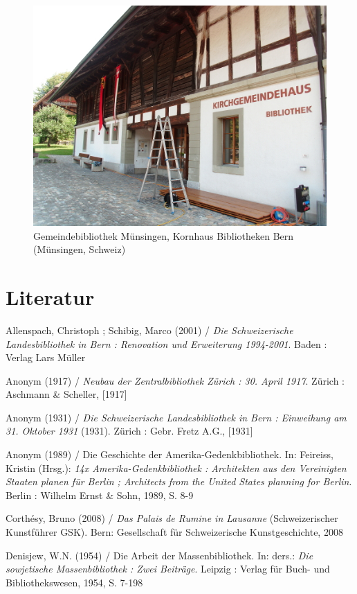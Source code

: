 \documentclass[a4paper,
fontsize=11pt,
oneside,
numbers=noperiodatend,
parskip=half-,
bibliography=totoc,
final
]{scrartcl}
\begin{document}
\begin{figure}[H]
\centering
\includegraphics{./img/066.jpg}
\caption{Gemeindebibliothek Münsingen, Kornhaus Bibliotheken Bern
(Münsingen,
Schweiz)}
\end{figure}

\newpage

\section*{Literatur}\label{literatur}

Allenspach, Christoph ; Schibig, Marco (2001) / \emph{Die Schweizerische
Landesbibliothek in Bern : Renovation und Erweiterung 1994-2001}. Baden
: Verlag Lars Müller

Anonym (1917) / \emph{Neubau der Zentralbibliothek Zürich : 30. April
1917}. Zürich : Aschmann \& Scheller, {[}1917{]}

Anonym (1931) / \emph{Die Schweizerische Landesbibliothek in Bern :
Einweihung am 31. Oktober 1931} (1931). Zürich : Gebr. Fretz A.G.,
{[}1931{]}

Anonym (1989) / Die Geschichte der Amerika-Gedenkbibliothek. In:
Feireiss, Kristin (Hrsg.): \emph{14x Amerika-Gedenkbibliothek :
Architekten aus den Vereinigten Staaten planen für Berlin ; Architects
from the United States planning for Berlin}. Berlin : Wilhelm Ernst \&
Sohn, 1989, S. 8-9

Corthésy, Bruno (2008) / \emph{Das Palais de Rumine in Lausanne}
(Schweizerischer Kunstführer GSK). Bern: Gesellschaft für Schweizerische
Kunstgeschichte, 2008

Denisjew, W.N. (1954) / Die Arbeit der Massenbibliothek. In: ders.:
\emph{Die sowjetische Massenbibliothek : Zwei Beiträge}. Leipzig :
Verlag für Buch- und Bibliothekswesen, 1954, S. 7-198
\end{document}
